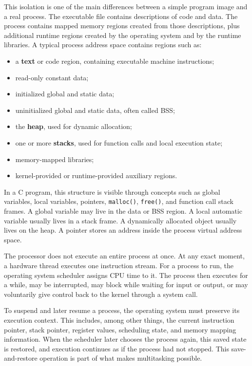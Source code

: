 \documentclass[a4paper,twoside]{report}
\begin{document}
This isolation is one of the main differences between a simple program image and a real process. The executable file contains descriptions of code and data. The process contains mapped memory regions created from those descriptions, plus additional runtime regions created by the operating system and by the runtime libraries. A typical process address space contains regions such as:

\begin{itemize}
    \item a \textbf{text} or code region, containing executable machine instructions;
    \item read-only constant data;
    \item initialized global and static data;
    \item uninitialized global and static data, often called BSS;
    \item the \textbf{heap}, used for dynamic allocation;
    \item one or more \textbf{stacks}, used for function calls and local execution state;
    \item memory-mapped libraries;
    \item kernel-provided or runtime-provided auxiliary regions.
\end{itemize}

In a C program, this structure is visible through concepts such as global variables, local variables, pointers, \texttt{malloc()}, \texttt{free()}, and function call stack frames. A global variable may live in the data or BSS region. A local automatic variable usually lives in a stack frame. A dynamically allocated object usually lives on the heap. A pointer stores an address inside the process virtual address space.

The processor does not execute an entire process at once. At any exact moment, a hardware thread executes one instruction stream. For a process to run, the operating system scheduler assigns CPU time to it. The process then executes for a while, may be interrupted, may block while waiting for input or output, or may voluntarily give control back to the kernel through a system call.

To suspend and later resume a process, the operating system must preserve its execution context. This includes, among other things, the current instruction pointer, stack pointer, register values, scheduling state, and memory mapping information. When the scheduler later chooses the process again, this saved state is restored, and execution continues as if the process had not stopped. This save-and-restore operation is part of what makes multitasking possible.
\end{document}
